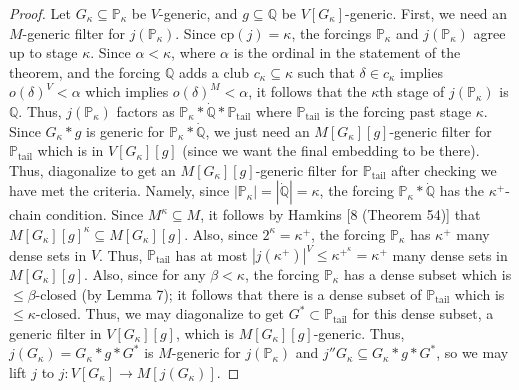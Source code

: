 \documentclass[10pt,leqno]{amsart}
\begin{document}
\begin{proof}
Let $G_{\kappa} \subseteq \mathbb{P}_{\kappa}$ be $V$-generic, and $g \subseteq \mathbb{Q}$ be $V[G_{\kappa}]$-generic. First, we need an $M$-generic filter for $j(\mathbb{P}_{\kappa})$. Since cp$(j) = \kappa$, the forcings $\mathbb{P}_{\kappa}$ and $j(\mathbb{P}_{\kappa})$ agree up to stage $\kappa$. Since $\alpha < \kappa$, where $\alpha$ is the ordinal in the statement of the theorem, and the forcing $\mathbb{Q}$ adds a club $c_{\kappa} \subseteq \kappa$ such that $\delta \in c_{\kappa}$ implies $o(\delta)^V < \alpha$ which implies $o(\delta)^M < \alpha$, it follows that the $\kappa$th stage of $j(\mathbb{P}_{\kappa})$ is $\mathbb{Q}$. Thus, $j(\mathbb{P}_{\kappa})$ factors as $\mathbb{P}_{\kappa}*\dot{\mathbb{Q}}*\mathbb{P}_{\mbox{tail}}$ where $\mathbb{P}_{\mbox{tail}}$ is the forcing past stage $\kappa$. Since $G_{\kappa}*g$ is generic for $\mathbb{P}_{\kappa}*\dot{\mathbb{Q}}$, we just need an $M[G_{\kappa}][g]$-generic filter for $\mathbb{P}_{\mbox{tail}}$ which is in $V[G_{\kappa}][g]$ (since we want the final embedding to be there). Thus, diagonalize to get an $M[G_{\kappa}][g]$-generic filter for $\mathbb{P}_{\mbox{tail}}$ after checking we have met the criteria. Namely, since $|\mathbb{P}_{\kappa}| = |\dot{\mathbb{Q}}| = \kappa$, the forcing $\mathbb{P}_{\kappa}*\dot{\mathbb{Q}}$ has the $\kappa^+$-chain condition. Since $M^{\kappa} \subseteq M$, it follows by Hamkins [8 (Theorem 54)] that $M[G_{\kappa}][g]^{\kappa} \subseteq M[G_{\kappa}][g]$. Also, since $2^{\kappa} = \kappa^+$, the forcing $\mathbb{P}_{\kappa}$ has $\kappa^+$ many dense sets in $V$. Thus, $\mathbb{P}_{\mbox{tail}}$ has at most $|j(\kappa^+)|^V \le \kappa^{+^{\kappa}} = \kappa^+$ many dense sets in $M[G_{\kappa}][g]$. Also, since for any $\beta < \kappa$, the forcing $\mathbb{P}_{\kappa}$ has a dense subset which is $\le \beta$-closed (by Lemma 7); it follows that there is a dense subset of $\mathbb{P}_{\mbox{tail}}$ which is $\le \kappa$-closed. Thus, we may diagonalize to get $G^* \subset \mathbb{P}_{\mbox{tail}}$ for this dense subset, a generic filter in $V[G_{\kappa}][g]$, which is $M[G_{\kappa}][g]$-generic. Thus, $j(G_{\kappa}) = G_{\kappa}*g*G^*$ is $M$-generic for $j(\mathbb{P}_{\kappa})$ and $j''G_{\kappa} \subseteq G_{\kappa}*g*G^*$, so we may lift $j$ to $j: V[G_{\kappa}] \to M[j(G_{\kappa})]$. 


\end{proof}
\end{document}
